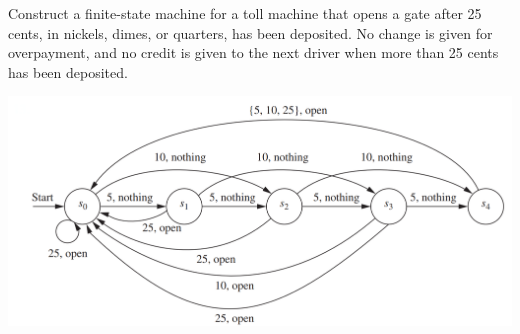 \documentclass[../main.tex]{subfiles}
\begin{document}
Construct a finite-state machine for a toll machine that opens a gate after 25 cents, in nickels, dimes, or quarters, has been deposited.
No change is given for overpayment, and no credit is given to the next driver when more than 25 cents has been deposited.

\solution
\center\includegraphics[angle=90,height=0.8\textheight]{img/13.png}
\end{document}
